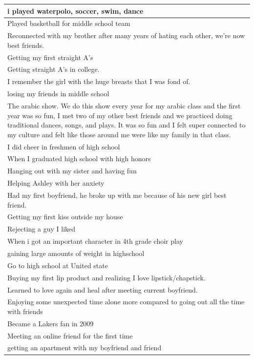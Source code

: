 \documentclass[
  .7em,
  letterpaper,
  DIV=11,
  numbers=noendperiod]{scrartcl}
\begin{document}
\begin{table}
\begin{tabular}{l}
\hline
i played waterpolo, soccer, swim, dance\\
\hline
Played basketball for middle school team\\
\hline
Reconnected with my brother after many years of hating each other, we're now best friends.\\
\hline
Getting my first straight A's\\
\hline
Getting straight A's in college.\\
\hline
I remember the girl with the huge breasts that I was fond of.\\
\hline
losing my friends in middle school\\
\hline
The arabic show. We do this show every year for my arabic class and the first year was so fun, I met two of my other best friends and we practiced doing traditional dances, songs, and plays. It was so fun and I felt super connected to my culture and felt like those around me were like my family in that class.\\
\hline
I did cheer in freshmen of high school\\
\hline
When I graduated high school with high honors\\
\hline
Hanging out with my sister and having fun\\
\hline
Helping Ashley with her anxiety\\
\hline
Had my first boyfriend, he broke up with me because of his new girl best friend.\\
\hline
Getting my first kiss outside my house\\
\hline
Rejecting a guy I liked\\
\hline
When i got an important character in 4th grade choir play\\
\hline
gaining large amounts of weight in highschool\\
\hline
Go to high school at United state\\
\hline
Buying my first lip product and realizing I love lipstick/chapstick.\\
\hline
Learned to love again and heal after meeting current boyfriend.\\
\hline
Enjoying some unexpected time alone more compared to going out all the time with friends\\
\hline
Became a Lakers fan in 2009\\
\hline
Meeting an online friend for the first time\\
\hline
getting an apartment with my boyfriend and friend\\

\end{tabular}
\end{table}
\end{document}
